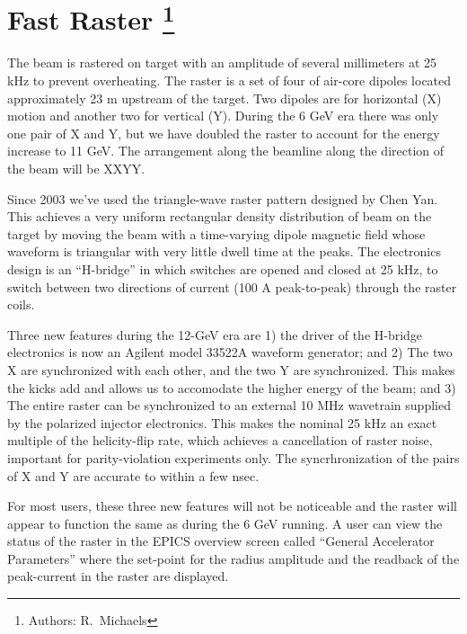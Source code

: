 \section[Fast Raster]{Fast Raster
\footnote{Authors: R.~Michaels }
}


The beam is rastered on target with an amplitude of
several millimeters at 25 kHz to prevent overheating.  
The raster is a set of four of air-core dipoles located
approximately 23 m upstream of the target. 
Two dipoles are for horizontal (X) motion and
another two for vertical (Y).  During the 6 GeV era
there was only one pair of X and Y, but we have doubled
the raster to account for the energy increase to 11 GeV.
The arrangement along the beamline along the 
direction of the beam will be XXYY.

Since 2003 we've used the triangle-wave 
raster pattern designed by Chen Yan.  
This achieves a very uniform rectangular
density distribution of beam on the target 
by moving the beam with a time-varying dipole
magnetic field whose waveform is triangular
with very little dwell time at the peaks.  
The electronics design is an ``H-bridge''
in which switches are opened and closed 
at 25 kHz, to switch between two directions 
of current (100 A peak-to-peak) 
through the raster coils.

Three new features during the 12-GeV era are 
1) the driver of the H-bridge electronics is now
an Agilent model 33522A waveform generator; and
2) The two X are synchronized with each other, and
the two Y are synchronized.  This makes the kicks
add and allows us to accomodate the higher energy
of the beam; and 3) The entire raster can
be synchronized to an external 10 MHz wavetrain
supplied by the polarized injector electronics.
This makes the nominal 25 kHz an exact multiple of
the helicity-flip rate, which achieves a cancellation
of raster noise, important for parity-violation 
experiments only.
The syncrhronization of the pairs of X and Y are
accurate to within a few nsec.

For most users, these three new features will not be
noticeable and the raster will appear to function
the same as during the 6 GeV running.
A user can view the 
status of the raster in the
EPICS overview screen called ``General Accelerator
Parameters'' where the set-point for the radius amplitude
and the readback of the peak-current in the raster are displayed.

